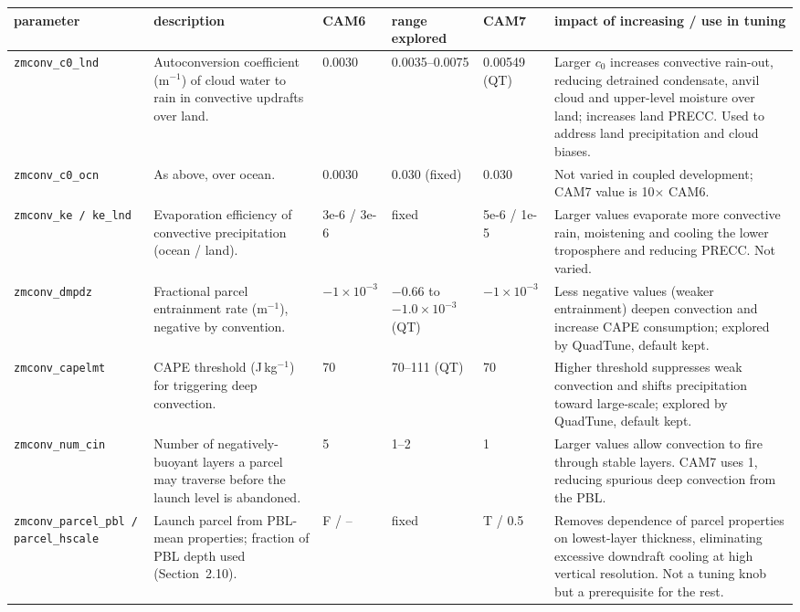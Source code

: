 \documentclass[draft]{agujournal2019}
\begin{document}
\scriptsize
 \begin{tabular}{p{2.3cm} p{3.1cm} p{0.9cm} p{1.8cm} p{1.0cm} p{4.2cm}}
  \hline
 parameter & description & CAM6 & range explored & CAM7 & impact of increasing / use in tuning \\
 \hline  \hline
\texttt{zmconv\_\allowbreak c0\_\allowbreak lnd} &
Autoconversion coefficient (m$^{-1}$) of cloud water to rain in convective
updrafts over land. &
0.0030 & 0.0035--0.0075 & 0.00549 (QT) &
Larger $c_0$ increases convective rain-out, reducing detrained condensate,
anvil cloud and upper-level moisture over land; increases land PRECC. Used to
address land precipitation and cloud biases. \\

\texttt{zmconv\_\allowbreak c0\_\allowbreak ocn} &
As above, over ocean. &
0.0030 & 0.030 (fixed) & 0.030 &
Not varied in coupled development; CAM7 value is 10$\times$ CAM6. \\

\texttt{zmconv\_\allowbreak ke / ke\_\allowbreak lnd} &
Evaporation efficiency of convective precipitation (ocean / land). &
3e-6 / 3e-6 & fixed & 5e-6 / 1e-5 &
Larger values evaporate more convective rain, moistening and cooling the
lower troposphere and reducing PRECC. Not varied. \\

\texttt{zmconv\_\allowbreak dmpdz} &
Fractional parcel entrainment rate (m$^{-1}$), negative by convention. &
$-1\times10^{-3}$ & $-0.66$ to $-1.0\times10^{-3}$ (QT) & $-1\times10^{-3}$ &
Less negative values (weaker entrainment) deepen convection and increase
CAPE consumption; explored by QuadTune, default kept. \\

\texttt{zmconv\_\allowbreak capelmt} &
CAPE threshold (J\,kg$^{-1}$) for triggering deep convection. &
70 & 70--111 (QT) & 70 &
Higher threshold suppresses weak convection and shifts precipitation toward
large-scale; explored by QuadTune, default kept. \\

\texttt{zmconv\_\allowbreak num\_\allowbreak cin} &
Number of negatively-buoyant layers a parcel may traverse before the
launch level is abandoned. &
5 & 1--2 & 1 &
Larger values allow convection to fire through stable layers. CAM7 uses 1,
reducing spurious deep convection from the PBL. \\

\texttt{zmconv\_\allowbreak parcel\_\allowbreak pbl / parcel\_\allowbreak hscale} &
Launch parcel from PBL-mean properties; fraction of PBL depth used
(Section~2.10). &
F / -- & fixed & T / 0.5 &
Removes dependence of parcel properties on lowest-layer thickness,
eliminating excessive downdraft cooling at high vertical resolution. Not a
tuning knob but a prerequisite for the rest. \\
 \hline
 \hline
 \end{tabular}
\normalsize
\end{document}
